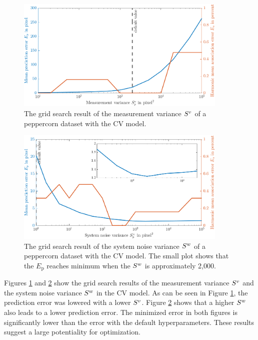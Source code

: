 \begin{figure}[htbp]
\centering
\includegraphics[width=0.9\textwidth]{figures/KF/meacov pfeffer cv2.png}
\caption{The grid search result of the measurement variance $S^{\boldmath{v}}$ of a peppercorn dataset with the CV model.}
\label{meacov}
\end{figure}

\begin{figure}[htbp]
\centering
\includegraphics[width=0.9\textwidth]{figures/KF/precov pfeffer cv .png}
\caption{The grid search result of the system noise variance $S^{\boldmath{w}}$ of a peppercorn dataset with the CV model. The small plot shows that the $E_{\mathrm{p}}$ reaches minimum when the $S^{\boldmath{w}}$ is approximately 2,000.}
\label{precov}
\end{figure}

Figures \ref{meacov} and \ref{precov} show the grid search results of the measurement variance $S^{\boldmath{v}}$ and the system noise variance $S^{\boldmath{w}}$ in the CV model. As can be seen in Figure \ref{meacov}, the prediction error was lowered with a lower $S^{\boldmath{v}}$. Figure \ref{precov} shows that a higher $S^{\boldmath{w}}$ also leads to a lower prediction error. The minimized error in both figures is significantly lower than the error with the default hyperparameters. These results suggest a large potentiality for optimization. 

